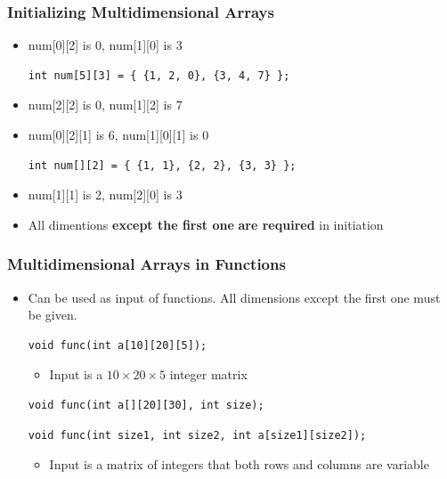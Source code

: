 \documentclass{../c-lecture}
\begin{document}
\begin{frame}[fragile]
  \frametitle{Initializing Multidimensional Arrays}
  \begin{itemize}
    \begin{verbatim}
int num[2][3] = {1, 2, 0, 3, 4, 7};
int num[2][3] = { {1, 2, 0}, {3, 4, 7} };
    \end{verbatim}
    \item num[0][2] is 0, num[1][0] is 3
    \begin{verbatim}
int num[5][3] = { {1, 2, 0}, {3, 4, 7} };
    \end{verbatim}
    \item num[2][2] is 0, num[1][2] is 7
  \end{itemize}
\end{frame}

\begin{frame}[fragile]
  \begin{itemize}
    \begin{verbatim}
int num[2][3][2] = { { {1, 2}, {3, 4}, {5, 6} }, { {1}, {2}, {3} } };
    \end{verbatim}
    \item num[0][2][1] is 6, num[1][0][1] is 0
    \begin{verbatim}
int num[][2] = { {1, 1}, {2, 2}, {3, 3} };
    \end{verbatim}
    \item num[1][1] is 2, num[2][0] is 3
    \item
      All dimentions
      \textbf{\color{Orange} except the first one} \textbf{\color{Yellow} are required} in
      initiation
  \end{itemize}
\end{frame}

\begin{frame}[fragile]
  \frametitle{Multidimensional Arrays in Functions}
  \begin{itemize}
    \item
      Can be used as input of functions. All dimensions except the first one
      {\color{YellowOrange} must} be given.

    \begin{verbatim}
void func(int a[10][20][5]);
    \end{verbatim}
    \begin{itemize}
      \item Input is a $10 \times 20 \times 5$ integer matrix
    \end{itemize}
    \begin{verbatim}
void func(int a[][20][30], int size);
    \end{verbatim}
    \begin{verbatim}
void func(int size1, int size2, int a[size1][size2]);
    \end{verbatim}
    \begin{itemize}
      \item
        Input is a matrix of integers that both rows and columns are variable
    \end{itemize}
  \end{itemize}
\end{frame}
\end{document}
